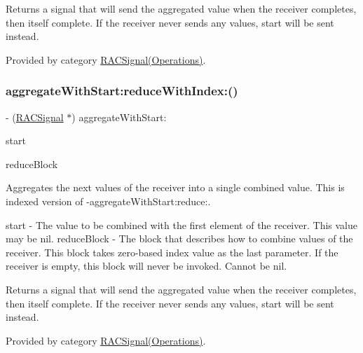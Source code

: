 Returns a signal that will send the aggregated value when the receiver completes, then itself complete. If the receiver never sends any values, {\ttfamily start} will be sent instead. 

Provided by category \mbox{\hyperlink{category_r_a_c_signal_07_operations_08_a83c6fc367091505aa6721f1c6a58d65d}{R\+A\+C\+Signal(\+Operations)}}.

\mbox{\label{interface_r_a_c_signal_a83c6fc367091505aa6721f1c6a58d65d}} 
\subsubsection{\texorpdfstring{aggregate\+With\+Start\+:reduce\+With\+Index\+:()}{aggregateWithStart:reduceWithIndex:()}\hspace{0.1cm}{\footnotesize\ttfamily [3/3]}}
{\footnotesize\ttfamily -\/ (\mbox{\hyperlink{interface_r_a_c_signal}{R\+A\+C\+Signal}} $\ast$) aggregate\+With\+Start\+: \begin{DoxyParamCaption}\item[{(id)}]{start }\item[{reduceWithIndex:(id($^\wedge$)(id running, id next, N\+S\+U\+Integer index))}]{reduce\+Block }\end{DoxyParamCaption}}

Aggregates the {\ttfamily next} values of the receiver into a single combined value. This is indexed version of -\/aggregate\+With\+Start\+:reduce\+:.

start -\/ The value to be combined with the first element of the receiver. This value may be {\ttfamily nil}. reduce\+Block -\/ The block that describes how to combine values of the receiver. This block takes zero-\/based index value as the last parameter. If the receiver is empty, this block will never be invoked. Cannot be nil.

Returns a signal that will send the aggregated value when the receiver completes, then itself complete. If the receiver never sends any values, {\ttfamily start} will be sent instead. 

Provided by category \mbox{\hyperlink{category_r_a_c_signal_07_operations_08_a83c6fc367091505aa6721f1c6a58d65d}{R\+A\+C\+Signal(\+Operations)}}.

